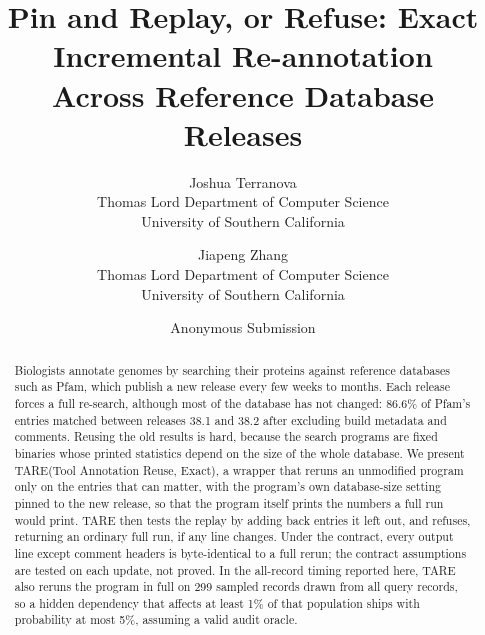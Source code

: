 \documentclass[letterpaper,twocolumn,10pt]{article}
\author{{\rm Joshua Terranova}\\Thomas Lord Department of Computer Science\\University of Southern California
      \and {\rm Jiapeng Zhang}\\Thomas Lord Department of Computer Science\\University of Southern California}}
\author{Anonymous Submission}
\title{Pin and Replay, or Refuse: Exact Incremental Re\nobreakdash-annotation\\
Across Reference Database Releases}
\date{}
\theoremstyle{definition}
\newcommand{\sys}{TARE\xspace}
\newcommand{\sysexpansion}{Tool Annotation Reuse, Exact}
\newcommand{\sys}{PARE\xspace}
\newcommand{\sysexpansion}{Pin And Replay Exact}
\begin{document}
\maketitle

\begin{abstract}
Biologists annotate genomes by searching their proteins against reference databases such as Pfam, which publish a
new release every few weeks to months. Each release forces a full re\nobreakdash-search, although most of the database has not
changed: 86.6\% of Pfam's entries matched between releases 38.1 and 38.2 after excluding build metadata and comments.
Reusing the old results is hard, because the search programs are fixed binaries whose printed statistics depend on
the size of the whole database. We present \sys (\sysexpansion), a wrapper that reruns an unmodified
program only on the entries that can matter, with the program's own database\nobreakdash-size setting pinned to the new
release, so that the program itself prints the numbers a full run would print. \sys then tests the replay by adding
back entries it left out, and refuses, returning an ordinary full run, if any line changes. Under the contract, every
output line except comment headers is byte\nobreakdash-identical to a full rerun; the contract assumptions are
tested on each update, not proved. In the all\nobreakdash-record timing reported here, \sys also reruns the program in full on 299
sampled records drawn from all query records, so a hidden dependency that affects at least 1\% of that population ships
with probability at most 5\%, assuming a valid audit oracle.


\end{abstract}
\end{document}
